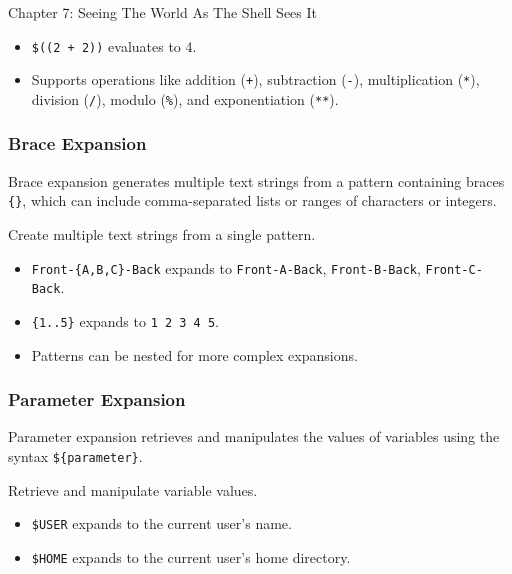 \begin{notes}{Chapter 7: Seeing The World As The Shell Sees It}
\begin{highlight}
    \begin{itemize}
        \item \texttt{\$((2 + 2))} evaluates to 4.
        \item Supports operations like addition (\texttt{+}), subtraction (\texttt{-}), multiplication (\texttt{*}), division (\texttt{/}), modulo (\texttt{\%}), and exponentiation (\texttt{**}).
    \end{itemize}
    
    \end{highlight}
    
    \subsubsection*{Brace Expansion}
    
    Brace expansion generates multiple text strings from a pattern containing braces \texttt{\{\}}, which can include comma-separated lists or ranges of characters or integers.
    
    \begin{highlight}
    
    Create multiple text strings from a single pattern.
    
    \begin{itemize}
        \item \texttt{Front-\{A,B,C\}-Back} expands to \texttt{Front-A-Back}, \texttt{Front-B-Back}, \texttt{Front-C-Back}.
        \item \texttt{\{1..5\}} expands to \texttt{1 2 3 4 5}.
        \item Patterns can be nested for more complex expansions.
    \end{itemize}
    
    \end{highlight}
    
    \subsubsection*{Parameter Expansion}
    
    Parameter expansion retrieves and manipulates the values of variables using the syntax \texttt{\$\{parameter\}}.
    
    \begin{highlight}
    
    Retrieve and manipulate variable values.
    
    \begin{itemize}
        \item \texttt{\$USER} expands to the current user's name.
        \item \texttt{\$HOME} expands to the current user's home directory.
    \end{itemize}
    

\end{highlight}
\end{notes}

